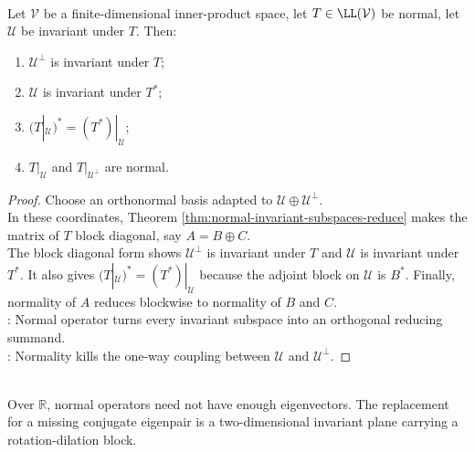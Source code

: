 \begin{corollary} \label{cor:normal-operator-invariant-subspaces-reduce} \\
Let $\mathcal{V}$ be a finite-dimensional inner-product space, let $T\in\LL(\mathcal{V})$ be normal, let $\mathcal{U}$ be invariant under $T$. Then:
\begin{enumerate}[label=(\roman*)]
\setlength{\itemsep}{0pt}
\item $\mathcal{U}^{\perp}$ is invariant under $T$;
\item $\mathcal{U}$ is invariant under $T^*$;
\item $(T|_{\mathcal{U}})^*=(T^*)|_{\mathcal{U}}$;
\item $T|_{\mathcal{U}}$ and $T|_{\mathcal{U}^{\perp}}$ are normal.
\end{enumerate}
\begin{proof}
Choose an orthonormal basis adapted to $\mathcal{U}\oplus\mathcal{U}^{\perp}$.\\
In these coordinates, Theorem \ref{thm:normal-invariant-subspaces-reduce} makes the matrix of $T$ block diagonal, say $A=B\oplus C$.\\
The block diagonal form shows $\mathcal{U}^{\perp}$ is invariant under $T$ and $\mathcal{U}$ is invariant under $T^*$. It also gives $(T|_{\mathcal{U}})^*=(T^*)|_{\mathcal{U}}$ because the adjoint block on $\mathcal{U}$ is $B^*$. Finally, normality of $A$ reduces blockwise to normality of $B$ and $C$.\\
: Normal operator turns every invariant subspace into an orthogonal reducing summand.\\
: Normality kills the one-way coupling between $\mathcal{U}$ and $\mathcal{U}^{\perp}$.
\end{proof}
\end{corollary}

\begin{perspective} \label{per:real-normal-operators-planes} \\
Over $\mathbb{R}$, normal operators need not have enough eigenvectors. The replacement for a missing conjugate eigenpair is a two-dimensional invariant plane carrying a rotation-dilation block.
\end{perspective}

